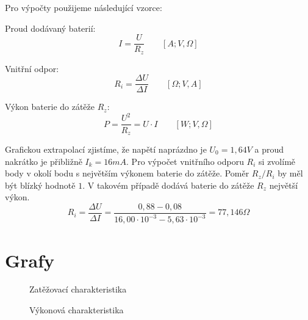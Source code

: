 \documentclass[12pt]{article} %
\begin{document}
Pro výpočty použijeme následující vzorce:

Proud dodávaný baterií:
\begin{equation}
I = \frac{U}{R_z} \qquad [A; V, \Omega]
\end{equation}

Vnitřní odpor:
\begin{equation}
R_i = \frac{\Delta U}{\Delta I} \qquad [\Omega; V, A]
\end{equation}

Výkon baterie do zátěže $R_z$:
\begin{equation}
P = \frac{U^{2}}{R_z} = U \cdot I \qquad [W; V, \Omega]
\end{equation}

Grafickou extrapolací zjistíme, že napětí naprázdno je $U_0 = 1,64V$ a proud nakrátko je přibližně $I_k = 16mA$. Pro výpočet vnitřního odporu $R_i$ si zvolímě body v okolí bodu s největším výkonem baterie do zátěže. Poměr $R_z/R_i$ by měl být blízký hodnotě $1$. V takovém případě dodává baterie do zátěže $R_z$ největší výkon.
\begin{equation}
R_i = \frac{\Delta U}{\Delta I} = \frac{0,88 - 0,08}{16,00\cdot 10^{-3} - 5,63\cdot 10^{-3}} = 77,146\Omega
\end{equation}

\section{Grafy}
\begin{figure}[H]
\centering
	\caption{Zatěžovací charakteristika}
\end{figure}

\begin{figure}[H]
\centering
	\caption{Výkonová charakteristika}
\end{figure}
\end{document}
